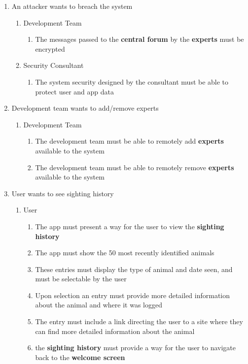 \documentclass[]{article}
\begin{document}
\begin{enumerate}[{BE}1.]
	\item An attacker wants to breach the system
	\begin{enumerate}[{VP2}.1]
		\item Development Team
			\begin{enumerate}
				\item The messages passed to the \textbf{central forum} by the \textbf{experts} must be encrypted
			\end{enumerate}
		\item Security Consultant
			\begin{enumerate}
					\item The system security designed by the consultant must be able to protect user and app data
			\end{enumerate}
	\end{enumerate}


	\item Development team wants to add/remove experts
	\begin{enumerate}[{VP3}.1]
		\item Development Team
			\begin{enumerate}
				\item The development team must be able to remotely add \textbf{experts} available to the system
				\item The development team must be able to remotely remove \textbf{experts} available to the system
			\end{enumerate}
	\end{enumerate}


	\item User wants to see sighting history
	\begin{enumerate}[{VP4}.1]
		\item User
			\begin{enumerate}
				\item The app must present a way for the user to view the \textbf{sighting history}
				\item The app must show the 50 most recently identified animals
				\item These entries must display the type of animal and date seen, and must be selectable by the user
				\item Upon selection an entry must provide more detailed information about the animal and where it was logged
				\item The entry must include a link directing the user to a site where they can find more detailed information about the animal
				\item the \textbf{sighting history} must provide a way for the user to navigate back to the \textbf{welcome screen}
			\end{enumerate}
	\end{enumerate}



\end{enumerate}
\end{document}
